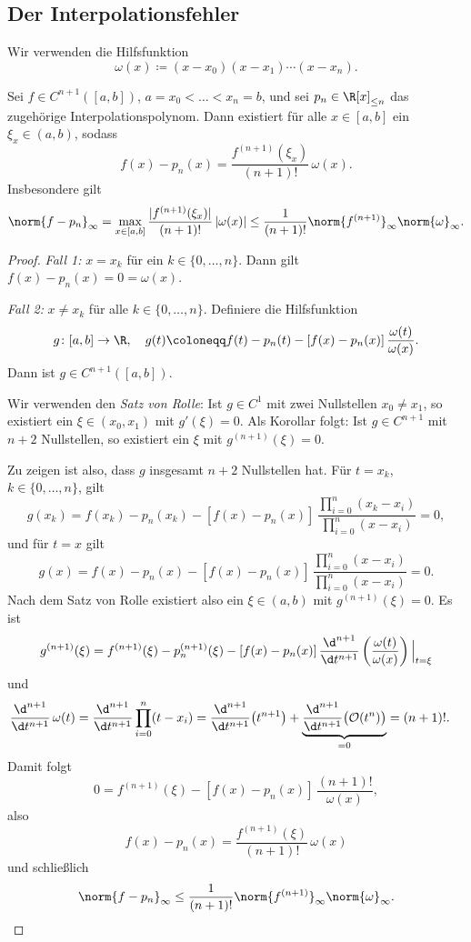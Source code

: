 \documentclass[11pt]{article}
\begin{document}
\subsection{Der Interpolationsfehler}

Wir verwenden die Hilfsfunktion
\[ \omega(x) \coloneqq (x - x_0)(x - x_1) \dotsm (x - x_n). \]

\begin{theorem}[Fehlerdarstellung]\Theorem
  Sei $f \in C^{n+1}([a, b])$, $a = x_0 < \dots < x_n = b$, und sei $p_n \in \R[x]_{\le n}$ das zugehörige Interpolationspolynom.
  Dann existiert für alle $x \in [a, b]$ ein $\xi_x \in (a, b)$, sodass
  \[ f(x) - p_n(x) = \frac{f^{(n+1)}(\xi_x)}{(n+1)!}\, \omega(x). \]
  Insbesondere gilt
  \[
    \norm{f - p_n}_{\infty} = \max_{x \in [a, b]} \frac{\lvert f^{(n+1)}(\xi_x) \rvert}{(n+1)!}\, \lvert \omega(x) \rvert
    \le \frac{1}{(n+1)!} \norm{f^{(n+1)}}_{\infty} \norm{\omega}_{\infty}.
  \]
\end{theorem}
\begin{proof}
  \textit{Fall 1:} $x = x_k$ für ein $k \in \{0, \dots, n\}$. Dann gilt $f(x) - p_n(x) = 0 = \omega(x)$.

  \textit{Fall 2:} $x \neq x_k$ für alle $k \in \{0, \dots, n\}$.
  Definiere die Hilfsfunktion
  \[
    g\colon [a, b] \to \R, \quad g(t) \coloneqq f(t) - p_n(t) - [f(x) - p_n(x)]\, \frac{\omega(t)}{\omega(x)}.
  \]
  Dann ist $g \in C^{n+1}([a, b])$.

  Wir verwenden den \textit{Satz von Rolle}: Ist $g \in C^1$ mit zwei Nullstellen $x_0 \neq x_1$, so existiert ein $\xi \in (x_0, x_1)$ mit $g'(\xi) = 0$.
  Als Korollar folgt: Ist $g \in C^{n+1}$ mit $n+2$ Nullstellen, so existiert ein $\xi$ mit $g^{(n+1)}(\xi) = 0$.

  Zu zeigen ist also, dass $g$ insgesamt $n+2$ Nullstellen hat.
  Für $t = x_k$, $k \in \{0, \dots, n\}$, gilt
  \[
    g(x_k) = f(x_k) - p_n(x_k) - [f(x) - p_n(x)]\, \frac{\prod_{i=0}^n (x_k - x_i)}{\prod_{i=0}^n (x - x_i)} = 0,
  \]
  und für $t = x$ gilt
  \[
    g(x) = f(x) - p_n(x) - [f(x) - p_n(x)]\, \frac{\prod_{i=0}^n (x - x_i)}{\prod_{i=0}^n (x - x_i)} = 0.
  \]
  Nach dem Satz von Rolle existiert also ein $\xi \in (a, b)$ mit $g^{(n+1)}(\xi) = 0$. Es ist
  \[
    g^{(n+1)}(\xi) = f^{(n+1)}(\xi) - p_n^{(n+1)}(\xi) - [f(x) - p_n(x)]\, \frac{\d^{n+1}}{\d t^{n+1}} \left( \frac{\omega(t)}{\omega(x)} \right)\Big|_{t = \xi}
  \]
  und
  \begin{align*}
    \frac{\d^{n+1}}{\d t^{n+1}}\, \omega(t) &= \frac{\d^{n+1}}{\d t^{n+1}} \prod_{i=0}^{n} (t - x_i)
    = \frac{\d^{n+1}}{\d t^{n+1}} \bigl( t^{n+1} \bigr) + \underbrace{\frac{\d^{n+1}}{\d t^{n+1}} \bigl(\mathcal{O}(t^n)\bigr)}_{= 0}
    = (n+1)!.
  \end{align*}
  Damit folgt
  \[ 0 = f^{(n+1)}(\xi) - [f(x) - p_n(x)]\, \frac{(n+1)!}{\omega(x)}, \]
  also
  \[ f(x) - p_n(x) = \frac{f^{(n+1)}(\xi)}{(n+1)!}\, \omega(x) \]
  und schließlich
  \[ \norm{f - p_n}_{\infty} \le \frac{1}{(n+1)!} \norm{f^{(n+1)}}_{\infty} \norm{\omega}_{\infty}. \qedhere \]
\end{proof}
\end{document}
